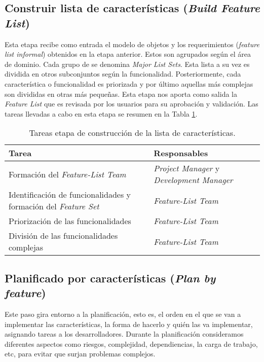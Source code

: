 \documentclass[11pt]{article}
\begin{document}
\subsection {Construir lista de características (\textit{Build Feature List})}

Esta etapa recibe como entrada el modelo de objetos y los requerimientos (\textit{feature list informal}) obtenidos en la etapa anterior.  Estos son agrupados según el área de dominio. Cada grupo de se denomina \textit{Major List Sets}. Esta lista a su vez es dividida en otros subconjuntos según la funcionalidad. Posteriormente, cada característica o funcionalidad es priorizada y por último aquellas más complejas son divididas en otras más pequeñas. Esta etapa nos aporta como salida la \textit{Feature List} que es revisada por los usuarios para su aprobación y validación. Las tareas llevadas a cabo en esta etapa se resumen en la Tabla \ref{fig:BFL}. \\

\begin{table}[H]
  \centering
\begin{tabular}{ |p{6cm}|p{6cm}|  }
	\hline
	Tarea & Responsables \\
	\hline
	Formación del
	\textit{Feature-List Team}  &    \textit{Project
		Manager} y 
	\textit{	Development
		Manager}\\
	Identificación de funcionalidades y formación del \textit{Feature Set}  & \textit{Feature-List Team}\\
	Priorización de las funcionalidades &  \textit{Feature-List Team}\\
	División de las funcionalidades complejas    & \textit{Feature-List Team}\\
	\hline
\end{tabular}
\caption{Tareas etapa de construcción de la lista de características.}\label{fig:BFL}
\end{table}

\subsection{Planificado por características (\textit{Plan by feature})}
Este paso gira entorno a la planificación, esto es, el orden en el que se van a implementar las características, la forma de hacerlo y quién las va implementar, asignando tareas a los desarrolladores.
Durante la planificación consideramos diferentes aspectos como riesgos, complejidad, dependiencias, la carga de trabajo, etc, para evitar que surjan problemas complejos.
\end{document}
